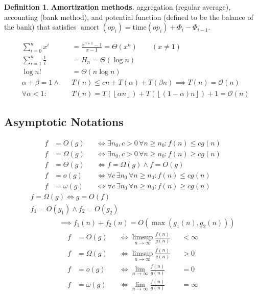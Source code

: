 \documentclass[]{article}
\newcommand\compactsubsection[1]        {\vspace{-10pt}\subsection{#1}\vspace{-6pt}}
\theoremstyle{definition}
\newtheorem{Definition}{\color{defiColor}Definition}
\newcommand\oc    {\mathcal{O}}
\newcommand\rf    {\right\rfloor}
\newcommand\lf    {\left\lfloor}
\newcommand\floor [1] {\lf #1 \rf}
\renewcommand\inf {\infty}
\newcommand\co        {\colon}
\newcommand\ag        {\alpha}
\newcommand\bg        {\beta}
\newcommand\logn      {\log n}
\newcommand\dequad    {\!\!\!\!\!\!}
\DeclareMathOperator\amort   {amort}
\begin{document}
\begin{multicols}{4}
\begin{Definition}
				\textbf{Amortization methods. }aggregation (regular average), accounting (bank method), and potential function (defined to be the balance of the bank) that satisfies $\amort(op_i) = \mathrm{time}(op_i) + \Phi_i - \Phi_{i - 1}$. 
			\end{Definition}
			\vspace{-16pt}\begin{alignat*}{9}
				&\textstyle\sum_{i = 0}^{n} x^i          &&= \tfrac{x^{n + 1} - 1}{x - 1} = \Theta(x^n)  \quad\quad(x \neq 1) \\
				&\textstyle\sum_{i = 1}^{n} \tfrac{1}{i} &&= H_n = \Theta(\logn) \\
				&\textstyle\log n!                       &&= \Theta(n\logn) \\
				&\textstyle \ag + \bg = 1 \land          &&T(n) \le cn + T(\ag) + T(\bg n) \implies T(n) = \oc(n) \\
				&\textstyle \forall \ag < 1 \co          &&T(n) = T(\floor{\ag n}) + T(\floor{(1 - \ag)n}) + 1 = \oc(n)
			\end{alignat*}\vspace{-10pt}
			
			\vspace{-3pt}
			\compactsubsection{Asymptotic Notations}
			\vspace{-5pt}
			\begin{alignat*}{9}
				f &= O(g) &&\iff \exists n_0, c > 0\, \forall n \ge n_0\co f(n) \le c g(n) \\
				f &= \Omega(g) &&\iff \exists n_0, c > 0\, \forall n \ge n_0\co f(n) \ge c g(n) \\
				f &= \Theta(g) &&\iff f = \Omega(g) \land f = O(g) \\
				f &= o(g) &&\iff \forall c\, \exists n_0\, \forall n \ge n_0\co f(n) \le cg(n) \\
				f &= \omega(g) &&\iff \forall c\, \exists n_0\, \forall n \ge n_0\co f(n) \ge cg(n)
			\end{alignat*}
			\vspace{-15pt}
			\begin{gather*}
				f = \Omega(g) \iff g = O(f) \\
				\dequad f_1 = O(g_1) \land f_2 = O(g_2)\quad\quad\quad\quad  \\ \quad\quad\quad\quad  \implies f_1(n) + f_2(n) = O(\max(g_1(n), g_2(n)))
			\end{gather*}
			\vspace{-15pt}
			\begin{alignat*}{9}
				f &= O(g)      &&\iff \limsup_{n \to \inf} \textstyle \frac{f(n)}{g(n)} &&< \inf \\
				f &= \Omega(g) &&\iff \limsup_{n \to \inf} \textstyle \frac{f(n)}{g(n)} &&> 0 \\
				f &= o(g)      &&\iff \lim_{n \to \inf}    \textstyle \frac{f(n)}{g(n)} &&= 0 \\
				f &= \omega(g) &&\iff \lim_{n \to \inf}    \textstyle \frac{f(n)}{g(n)} &&= \inf
			\end{alignat*}
			

\end{multicols}
\end{document}
